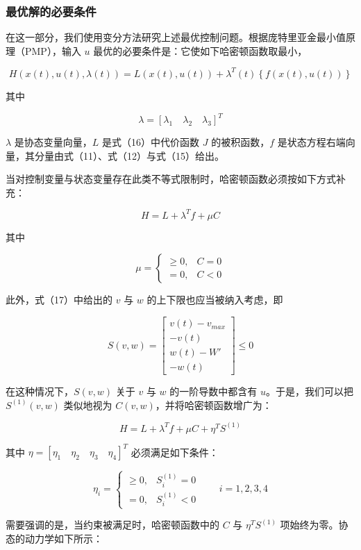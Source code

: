 \documentclass[11pt,a4paper]{ctexart}
\begin{document}
\subsubsection{最优解的必要条件}

在这一部分，我们使用变分方法研究上述最优控制问题。根据庞特里亚金最小值原理（PMP），输入 $u$ 最优的必要条件是：它使如下哈密顿函数取最小，

\[
H\left(x(t),u(t),\lambda(t)\right)=L\left(x(t),u(t)\right)+\lambda^{T}(t)\left\{f\left(x(t),u(t)\right)\right\}
\]

其中

\[
\lambda=\left[\lambda_1\quad\lambda_2\quad\lambda_3\right]^{T}
\]

$\lambda$ 是协态变量向量，$L$ 是式（16）中代价函数 $J$ 的被积函数，$f$ 是状态方程右端向量，其分量由式（11）、式（12）与式（15）给出。

当对控制变量与状态变量存在此类不等式限制时，哈密顿函数必须按如下方式补充：

\[
H=L+\lambda^{T}f+\mu C
\]

其中

\[
\mu=\left\{\begin{array}{ll}\geq 0, & C=0\\[0.2em] =0, & C<0\end{array}\right.
\]

此外，式（17）中给出的 $v$ 与 $w$ 的上下限也应当被纳入考虑，即

\[
S(v,w)=\left[\begin{array}{c}v(t)-v_{max}\\ -v(t)\\ w(t)-W'\\ -w(t)\end{array}\right]\leq 0
\]

在这种情况下，$S(v,w)$ 关于 $v$ 与 $w$ 的一阶导数中都含有 $u$。于是，我们可以把 $S^{(1)}(v,w)$ 类似地视为 $C(v,w)$，并将哈密顿函数增广为：

\[
H=L+\lambda^{T}f+\mu C+\eta^{T}S^{(1)}
\]

其中 $\eta=\left[\eta_1\quad\eta_2\quad\eta_3\quad\eta_4\right]^{T}$ 必须满足如下条件：

\[
\eta_i=\left\{\begin{array}{ll}\geq 0, & S_i^{(1)}=0\\[0.2em] =0, & S_i^{(1)}<0\end{array}\right.\qquad i=1,2,3,4
\]

需要强调的是，当约束被满足时，哈密顿函数中的 $C$ 与 $\eta^{T}S^{(1)}$ 项始终为零。协态的动力学如下所示：
\end{document}
